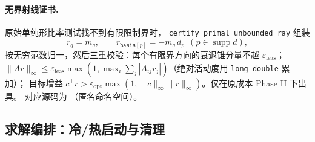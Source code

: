 \paragraph{无界射线证书.}
原始单纯形比率测试找不到有限限制界时，
\texttt{certify\_primal\_unbounded\_ray} 组装
\begin{equation}
  r_q = m_q,\qquad r_{\texttt{basis}[p]} = -m_q\, d_p
  \ \ (p \in \operatorname{supp} d),
\end{equation}
按无穷范数归一，然后三重校验：每个有限界方向的衰退锥分量不越
$\varepsilon_{\text{feas}}$；$\|A r\|_{\infty} \le \varepsilon_{\text{feas}}
\max(1, \max_i \sum_j |A_{ij} r_j|)$（绝对活动度用 \texttt{long double} 累加）；
目标增益 $c^{\top} r > \varepsilon_{\text{opt}} \max(1,
\|c\|_{\infty} \|r\|_{\infty})$。仅在原成本 Phase II 下出具。
对应源码为 
（匿名命名空间）。

\subsection{求解编排：冷/热启动与清理}
\label{subsec:engine-lp-driver}

